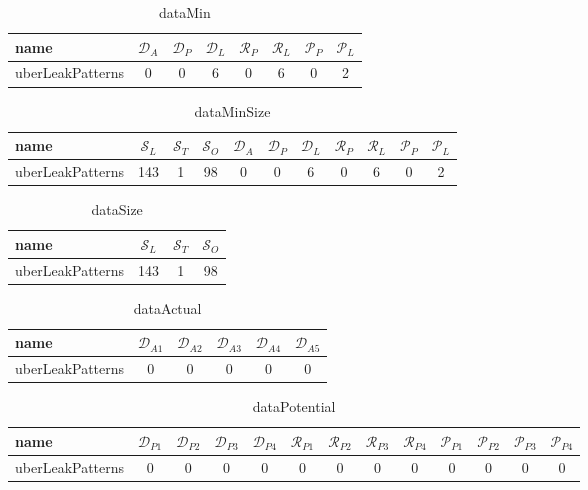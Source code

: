 \documentclass{article}
\begin{document}
\begin{table}[ht]
\centering
\begin{tabular}{|l|c|c|c|c|c|c|c|}
\hline
name & $\mathcal{D}_A$ & $\mathcal{D}_P$ & $\mathcal{D}_L$ & $\mathcal{R}_P$ & $\mathcal{R}_L$ & $\mathcal{P}_P$ & $\mathcal{P}_L$ \\ \hline
uberLeakPatterns & 0 & 0 & 6 & 0 & 6 & 0 & 2  \\ \hline
\end{tabular}
\caption{dataMin}
\label{Tab:dataMin}
\end{table}


\begin{table}[ht]
\centering
\begin{tabular}{|l|c|c|c|c|c|c|c|c|c|c|}
\hline
name  & $\mathcal{S}_L$ & $\mathcal{S}_T$ & $\mathcal{S}_O$ & $\mathcal{D}_A$ & $\mathcal{D}_P$ & $\mathcal{D}_L$ & $\mathcal{R}_P$ & $\mathcal{R}_L$ & $\mathcal{P}_P$ & $\mathcal{P}_L$ \\ \hline
uberLeakPatterns & 143 & 1 & 98 & 0 & 0 & 6 & 0 & 6 & 0 & 2  \\ \hline
\end{tabular}
\caption{dataMinSize}
\label{Tab:dataMinSize}
\end{table}


\begin{table}[ht]
\centering
\begin{tabular}{|l|c|c|c|}
\hline
name  & $\mathcal{S}_L$ & $\mathcal{S}_T$ & $\mathcal{S}_O$ \\ \hline
uberLeakPatterns & 143 & 1 & 98   \\ \hline
\end{tabular}
\caption{dataSize}
\label{Tab:dataSize}
\end{table}


\begin{table}[ht]
\centering
\begin{tabular}{|l|c|c|c|c|c|}
\hline
name & $\mathcal{D}_{A1}$ & $\mathcal{D}_{A2}$ & $\mathcal{D}_{A3}$ & $\mathcal{D}_{A4}$ & $\mathcal{D}_{A5}$ \\ \hline
uberLeakPatterns & 0 & 0 & 0 & 0 & 0 \\ \hline
\end{tabular}
\caption{dataActual}
\label{Tab:dataActual}
\end{table}


\begin{table}[ht]
\centering
\begin{tabular}{|l|c|c|c|c|c|c|c|c|c|c|c|c|}
\hline
name & $\mathcal{D}_{P1}$ & $\mathcal{D}_{P2}$ & $\mathcal{D}_{P3}$ & $\mathcal{D}_{P4}$ & $\mathcal{R}_{P1}$ & $\mathcal{R}_{P2}$ & $\mathcal{R}_{P3}$ & $\mathcal{R}_{P4}$ & $\mathcal{P}_{P1}$& $\mathcal{P}_{P2}$ & $\mathcal{P}_{P3}$ & $\mathcal{P}_{P4}$\\ \hline
uberLeakPatterns & 0 & 0 & 0 & 0 & 0 & 0 & 0 & 0 & 0 & 0 & 0 & 0 \\ \hline
\end{tabular}
\caption{dataPotential}
\label{Tab:dataPotential}
\end{table}
\end{document}
